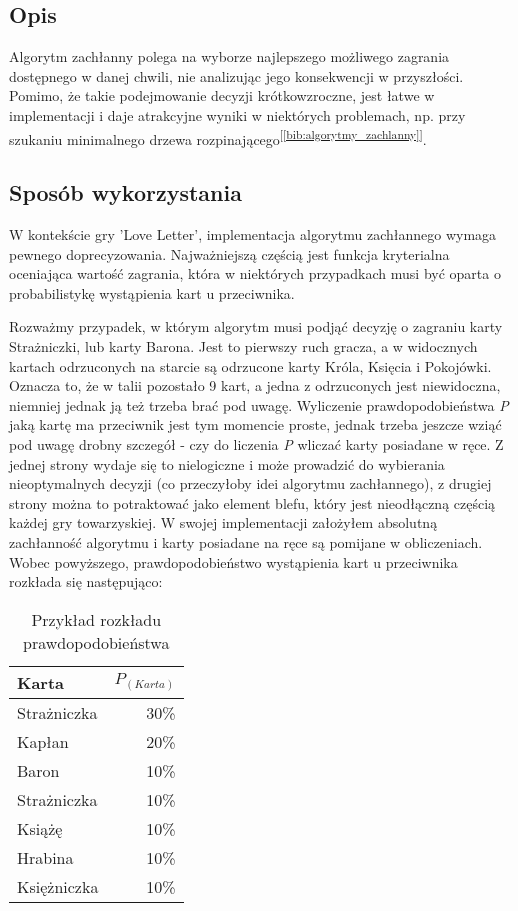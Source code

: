 \subsection{Opis}
Algorytm zachłanny polega na wyborze najlepszego możliwego zagrania dostępnego w danej chwili, nie analizując jego konsekwencji w przyszłości. Pomimo, że takie podejmowanie decyzji krótkowzroczne, jest łatwe w implementacji i daje atrakcyjne wyniki w niektórych problemach, np. przy szukaniu minimalnego drzewa rozpinającego\textsuperscript{[\ref{bib:algorytmy_zachlanny}]}.

\subsection{Sposób wykorzystania}

W kontekście gry 'Love Letter', implementacja algorytmu zachłannego wymaga pewnego doprecyzowania. Najważniejszą częścią jest funkcja kryterialna oceniająca wartość zagrania, która w niektórych przypadkach musi być oparta o probabilistykę wystąpienia kart u przeciwnika. 

Rozważmy przypadek, w którym algorytm musi podjąć decyzję o zagraniu karty Strażniczki, lub karty Barona. Jest to pierwszy ruch gracza, a w widocznych kartach odrzuconych na starcie są odrzucone karty Króla, Księcia i Pokojówki. Oznacza to, że w talii pozostało 9 kart, a jedna z odrzuconych jest niewidoczna, niemniej jednak ją też trzeba brać pod uwagę. Wyliczenie prawdopodobieństwa \textit{P} jaką kartę ma przeciwnik jest tym momencie proste, jednak trzeba jeszcze wziąć pod uwagę drobny szczegół - czy do liczenia \textit{P} wliczać karty posiadane w ręce. Z jednej strony wydaje się to nielogiczne i może prowadzić do wybierania nieoptymalnych decyzji (co przeczyłoby idei algorytmu zachłannego), z drugiej strony można to potraktować jako element blefu, który jest nieodłączną częścią każdej gry towarzyskiej. W swojej implementacji założyłem absolutną zachłanność algorytmu i karty posiadane na ręce są pomijane w obliczeniach. 
Wobec powyższego, prawdopodobieństwo wystąpienia kart u przeciwnika rozkłada się następująco:


\begin{table}[h]
	\caption{Przykład rozkładu prawdopodobieństwa}
	\centering
		\begin{tabular}{|l|r|}
			\hline
			Karta & $P_{(Karta)}$	\\ \hline
			Strażniczka & 30\% 			\\ \hline
			Kapłan & 20\% 				\\ \hline
			Baron & 10\% 				\\ \hline
			Strażniczka & 10\% 			\\ \hline
			Książę & 10\% 				\\ \hline
			Hrabina & 10\% 				\\ \hline
			Księżniczka & 10\% 			\\ \hline
		\end{tabular}
\end{table}

